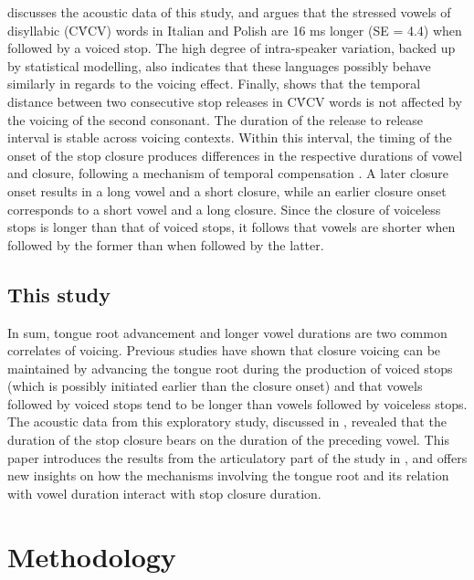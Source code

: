 \documentclass[12pt,]{article}
\begin{document}
\citet{coretta2018j} discusses the acoustic data of this study, and
argues that the stressed vowels of disyllabic (CV́CV) words in Italian
and Polish are 16 ms longer (SE = 4.4) when followed by a voiced stop.
The high degree of intra-speaker variation, backed up by statistical
modelling, also indicates that these languages possibly behave similarly
in regards to the voicing effect. Finally, \citet{coretta2018j} shows
that the temporal distance between two consecutive stop releases in CV́CV
words is not affected by the voicing of the second consonant. The
duration of the release to release interval is stable across voicing
contexts. Within this interval, the timing of the onset of the stop
closure produces differences in the respective durations of vowel and
closure, following a mechanism of temporal compensation
\citep{lindblom1967, slis1969a, slis1969, lehiste1970, lehiste1970a}. A
later closure onset results in a long vowel and a short closure, while
an earlier closure onset corresponds to a short vowel and a long
closure. Since the closure of voiceless stops is longer than that of
voiced stops, it follows that vowels are shorter when followed by the
former than when followed by the latter.

\hypertarget{this-study}{%
\subsection{This study}\label{this-study}}

In sum, tongue root advancement and longer vowel durations are two
common correlates of voicing. Previous studies have shown that closure
voicing can be maintained by advancing the tongue root during the
production of voiced stops (which is possibly initiated earlier than the
closure onset) and that vowels followed by voiced stops tend to be
longer than vowels followed by voiceless stops. The acoustic data from
this exploratory study, discussed in \citet{coretta2018j}, revealed that
the duration of the stop closure bears on the duration of the preceding
vowel. This paper introduces the results from the articulatory part of
the study in \citet{coretta2018j}, and offers new insights on how the
mechanisms involving the tongue root and its relation with vowel
duration interact with stop closure duration.

\hypertarget{methodology}{%
\section{Methodology}\label{methodology}}
\end{document}

